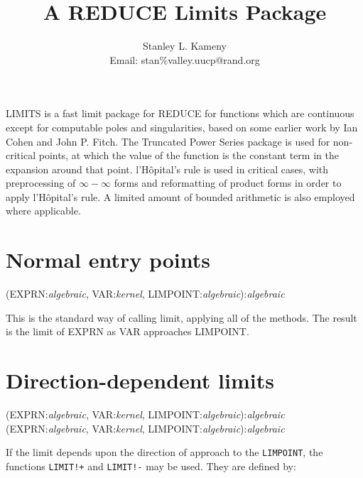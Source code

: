 \title{A REDUCE Limits Package}
\date{}
\author{Stanley L. Kameny \\ Email: stan\%valley.uucp@rand.org}

\maketitle

LIMITS is a fast limit package for REDUCE for functions which are
continuous except for computable poles and singularities, based on some
earlier work by Ian Cohen and John P. Fitch.  The Truncated Power Series
package is used for non-critical points, at which the value of the
function is the constant term in the expansion around that point.
l'H\^{o}pital's rule is used in critical cases, with preprocessing of
$\infty - \infty$ forms and reformatting of product forms in order
to apply l'H\^{o}pital's rule.  A limited amount of bounded arithmetic
is also employed where applicable.

\section{Normal entry points}
\vspace{.1in}
(EXPRN:{\em algebraic}, VAR:{\em kernel},
LIMPOINT:{\em algebraic}):{\em algebraic}
\vspace{.1in}

This is the standard way of calling limit, applying all of the methods. The
result is the limit of EXPRN as VAR approaches LIMPOINT.


\section{Direction-dependent limits}

 
\vspace{.1in}
(EXPRN:{\em algebraic}, VAR:{\em kernel},
LIMPOINT:{\em algebraic}):{\em algebraic} \\
(EXPRN:{\em algebraic}, VAR:{\em kernel},
LIMPOINT:{\em algebraic}):{\em algebraic}
\vspace{.1in}

If the limit depends upon the direction of approach to the {\tt LIMPOINT},
the functions {\tt LIMIT!+} and {\tt LIMIT!-} may be used.  They are
defined by:

